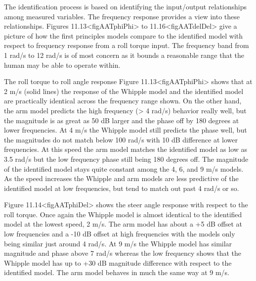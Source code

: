 \documentclass[a4paper]{article}
\begin{document}


The identification process is based on identifying the input/output
relationships among measured variables. The frequency response provides
a view into these relationships. Figures
11.13\textless{}figAATphiPhi\textgreater{} to
11.16\textless{}figAATdelDel\textgreater{} give a picture of how the
first principles models compare to the identified model with respect to
frequency response from a roll torque input. The frequency band from 1
rad/s to 12 rad/s is of most concern as it bounds a reasonable range
that the human may be able to operate within.

The roll torque to roll angle response
Figure 11.13\textless{}figAATphiPhi\textgreater{} shows that at 2 m/s
(solid lines) the response of the Whipple model and the identified model
are practically identical across the frequency range shown. On the other
hand, the arm model predicts the high frequency (\textgreater{} 4 rad/s)
behavior really well, but the magnitude is as great as 50 dB larger and
the phase off by 180 degrees at lower frequencies. At 4 m/s the Whipple
model still predicts the phase well, but the magnitudes do not match
below 100 rad/s with 10 dB difference at lower frequencies. At this
speed the arm model matches the identified model as low as 3.5 rad/s but
the low frequency phase still being 180 degrees off. The magnitude of
the identified model stays quite constant among the 4, 6, and 9 m/s
models. As the speed increases the Whipple and arm models are less
predictive of the identified model at low frequencies, but tend to match
out past 4 rad/s or so.


Figure 11.14\textless{}figAATphiDel\textgreater{} shows the steer angle
response with respect to the roll torque. Once again the Whipple model
is almost identical to the identified model at the lowest speed, 2 m/s.
The arm model has about a +5 dB offset at low frequencies and a -10 dB
offset at high frequencies with the models only being similar just
around 4 rad/s. At 9 m/s the Whipple model has similar magnitude and
phase above 7 rad/s whereas the low frequency shows that the Whipple
model has up to +30 dB magnitude difference with respect to the
identified model. The arm model behaves in much the same way at 9 m/s.

\end{document}
